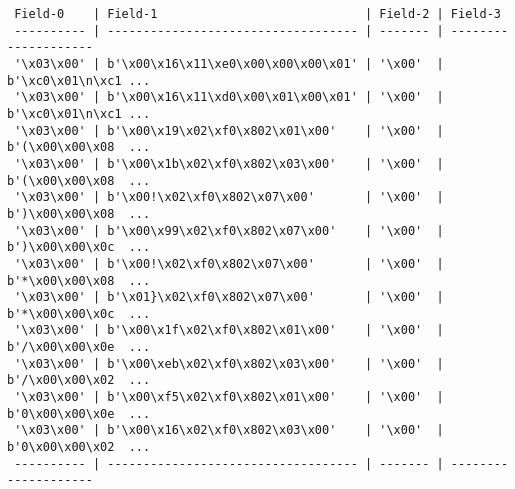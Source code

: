\begin{verbatim}
 Field-0    | Field-1                             | Field-2 | Field-3         
 ---------- | ----------------------------------- | ------- | --------------------
 '\x03\x00' | b'\x00\x16\x11\xe0\x00\x00\x00\x01' | '\x00'  | b'\xc0\x01\n\xc1 ...
 '\x03\x00' | b'\x00\x16\x11\xd0\x00\x01\x00\x01' | '\x00'  | b'\xc0\x01\n\xc1 ...
 '\x03\x00' | b'\x00\x19\x02\xf0\x802\x01\x00'    | '\x00'  | b'(\x00\x00\x08  ...
 '\x03\x00' | b'\x00\x1b\x02\xf0\x802\x03\x00'    | '\x00'  | b'(\x00\x00\x08  ...
 '\x03\x00' | b'\x00!\x02\xf0\x802\x07\x00'       | '\x00'  | b')\x00\x00\x08  ...
 '\x03\x00' | b'\x00\x99\x02\xf0\x802\x07\x00'    | '\x00'  | b')\x00\x00\x0c  ...
 '\x03\x00' | b'\x00!\x02\xf0\x802\x07\x00'       | '\x00'  | b'*\x00\x00\x08  ...
 '\x03\x00' | b'\x01}\x02\xf0\x802\x07\x00'       | '\x00'  | b'*\x00\x00\x0c  ...
 '\x03\x00' | b'\x00\x1f\x02\xf0\x802\x01\x00'    | '\x00'  | b'/\x00\x00\x0e  ...
 '\x03\x00' | b'\x00\xeb\x02\xf0\x802\x03\x00'    | '\x00'  | b'/\x00\x00\x02  ...
 '\x03\x00' | b'\x00\xf5\x02\xf0\x802\x01\x00'    | '\x00'  | b'0\x00\x00\x0e  ...
 '\x03\x00' | b'\x00\x16\x02\xf0\x802\x03\x00'    | '\x00'  | b'0\x00\x00\x02  ...
 ---------- | ----------------------------------- | ------- | --------------------
\end{verbatim}
